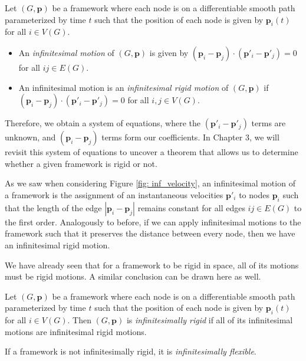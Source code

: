 \begin{definition}
\label{def: inf motion}
Let $(G,\mathbf{p})$ be a framework where each node is on a differentiable smooth path parameterized by time $t$ such that the position of each node is given by $\mathbf{p}_i(t)$ for all $i \in  V(G)$. 
\begin{itemize}
    \item An \textit{infinitesimal motion} of $(G,\mathbf{p})$ is given by $(\mathbf{p}_i - \mathbf{p}_j) \cdot (\mathbf{p}'_i - \mathbf{p}'_j) = 0$ for all $ij \in  E(G)$. 
    \vspace{-3mm}
    \item An infinitesimal motion is an \textit{infinitesimal rigid motion} of $(G,\mathbf{p})$ if $(\mathbf{p}_i - \mathbf{p}_j) \cdot (\mathbf{p}'_i - \mathbf{p}'_j) = 0$ for all $i,j \in  V(G)$. 
\end{itemize}
\noindent
Therefore, we obtain a system of equations, where the $(\mathbf{p}'_i - \mathbf{p}'_j)$ terms are unknown, and $(\mathbf{p}_i - \mathbf{p}_j)$ terms form our coefficients. In Chapter 3, we will revisit this system of equations to uncover a theorem that allows us to determine whether a given framework is rigid or not.
\end{definition}

\begin{flushleft}
As we saw when considering Figure \ref{fig: inf_velocity}, an infinitesimal motion of a framework is the assignment of an instantaneous velocities $\mathbf{p}'_i$ to nodes $\mathbf{p}_i$ such that the length of the edge $|\mathbf{p}_i - \mathbf{p}_j|$ remains constant for all edges $ij \in E(G)$ to the first order. Analogously to before, if we can apply infinitesimal motions to the framework such that it preserves the distance between every node, then we have an infinitesimal rigid motion. 
\end{flushleft}

\begin{flushleft}
We have already seen that for a framework to be rigid in space, all of its motions must be rigid motions. A similar conclusion can be drawn here as well.
\end{flushleft}

\begin{definition}
\label{def: inf rigid}
Let $(G,\mathbf{p})$ be a framework where each node is on a differentiable smooth path parameterized by time $t$ such that the position of each node is given by $\mathbf{p}_i(t)$ for all $i \in  V(G)$. Then $(G,\mathbf{p})$ is \textit{infinitesimally rigid} if all of its infinitesimal motions are infinitesimal rigid motions.

\noindent
If a framework is not infinitesimally rigid, it is \textit{infinitesimally flexible}.
\end{definition}

